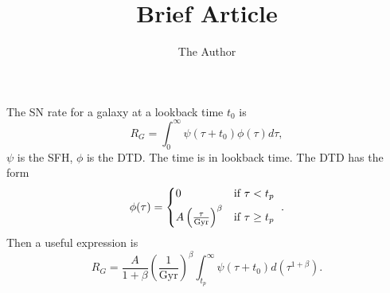 \documentclass[11pt, oneside]{article}   	%
\title{Brief Article}
\author{The Author}
\begin{document}
\maketitle
The SN rate for a galaxy at a lookback time $t_0$ is
\begin{equation}
R_G=\int_{0}^{\infty} \psi(\tau+t_0) \phi(\tau) d\tau,
\end{equation}
$\psi$ is the SFH, $\phi$ is the DTD.  The time is in lookback time.
The DTD has the form
\begin{equation}
\phi(\tau) =  
\begin{cases*} 
            0  &  if $\tau < t_p$  \\
             A \left(\frac{\tau}{\mathrm{Gyr}} \right)^\beta  & if $\tau \geq t_p$ 
          \end{cases*}.
\end{equation}
Then a useful expression is
\begin{equation}
R_G=\frac{A}{1+\beta}  \left(\frac{1}{\mathrm{Gyr}} \right)^\beta \int_{t_p}^{\infty} \psi(\tau+t_0) d(\tau^{1+\beta}).
\end{equation}
\end{document}
